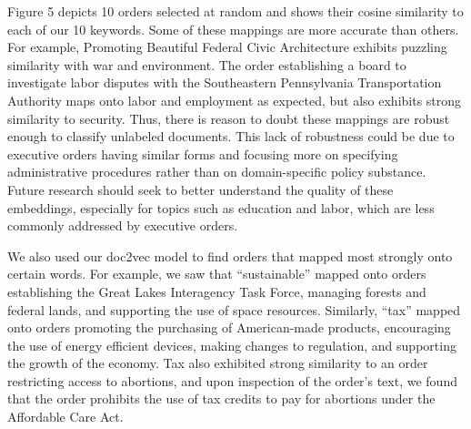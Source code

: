 \documentclass{article}
\begin{document}
{{Figure 5 depicts 10 orders selected at random and shows their cosine similarity to each of our 10 keywords. Some of these mappings are more accurate than others. For example, Promoting Beautiful Federal Civic Architecture exhibits puzzling similarity with war and environment. The order establishing a board to investigate labor disputes with the Southeastern Pennsylvania Transportation Authority maps onto labor and employment as expected, but also exhibits strong similarity to security. Thus, there is reason to doubt these mappings are robust enough to classify unlabeled documents. This lack of robustness could be due to executive orders having similar forms and focusing more on specifying administrative procedures rather than on domain-specific policy substance. Future research should seek to better understand the quality of these embeddings, especially for topics such as education and labor, which are less commonly addressed by executive orders.

We also used our doc2vec model to find orders that mapped most strongly onto certain words. For example, we saw that “sustainable” mapped onto orders establishing the Great Lakes Interagency Task Force, managing forests and federal lands, and supporting the use of space resources. Similarly, “tax” mapped onto orders promoting the purchasing of American-made products, encouraging the use of energy efficient devices, making changes to regulation, and supporting the growth of the economy.  Tax also exhibited strong similarity to an order restricting access to abortions, and upon inspection of the order’s text, we found that the order prohibits the use of tax credits to pay for abortions under the Affordable Care Act. 

}}
\end{document}
